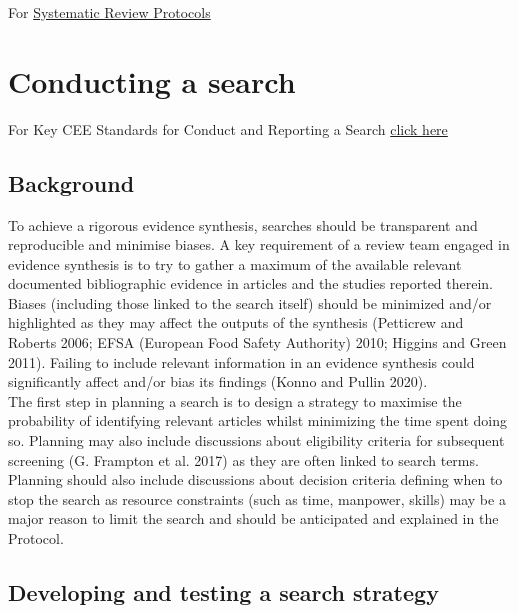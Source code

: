 \documentclass[
  letterpaper,
  DIV=11,
  numbers=noendperiod]{scrreprt}
\begin{document}
For
\href{https://environmentalevidencejournal.biomedcentral.com/submission-guidelines/preparing-your-manuscript/systematic-review-protocol}{Systematic
Review Protocols}


\chapter{Conducting a search}\label{sec-chapt4}

For Key CEE Standards for Conduct and Reporting a Search
\href{https://environmentalevidence.org/standards-table/}{click here}

\section{\texorpdfstring{\textbf{Background}}{Background}}\label{background}

To achieve a rigorous evidence synthesis, searches should be transparent
and reproducible and minimise biases. A key requirement of a review team
engaged in evidence synthesis is to try to gather a maximum of the
available relevant documented bibliographic evidence in articles and the
studies reported therein. Biases (including those linked to the search
itself) should be minimized and/or highlighted as they may affect the
outputs of the synthesis (Petticrew and Roberts 2006; EFSA (European
Food Safety Authority) 2010; Higgins and Green 2011). Failing to include
relevant information in an evidence synthesis could significantly affect
and/or bias its findings (Konno and Pullin 2020).\\
The first step in planning a search is to design a strategy to maximise
the probability of identifying relevant articles whilst minimizing the
time spent doing so. Planning may also include discussions about
eligibility criteria for subsequent screening (G. Frampton et al. 2017)
as they are often linked to search terms. Planning should also include
discussions about decision criteria defining when to stop the search as
resource constraints (such as time, manpower, skills) may be a major
reason to limit the search and should be anticipated and explained in
the Protocol.

\section{Developing and testing a search
strategy}\label{developing-and-testing-a-search-strategy}
\end{document}
